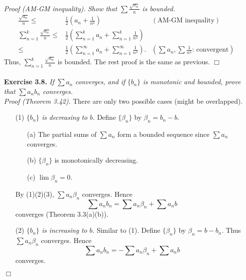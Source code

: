 \documentclass{article}
\begin{document}
\emph{Proof (AM-GM inequality).}
\emph{Show that $\sum\frac{\sqrt{a_n}}{n}$ is bounded.}
\begin{align*}
\frac{\sqrt{a_n}}{n}
\leq&
\frac{1}{2}
\left( a_n + \frac{1}{n^2} \right)
  &(\text{AM-GM inequality}) \\
\sum_{n=1}^{k} \frac{\sqrt{a_n}}{n}
\leq&
\frac{1}{2}
\left( \sum_{n=1}^{k} a_n + \sum_{n=1}^{k} \frac{1}{n^2} \right) \\
\leq&
\frac{1}{2}
\left( \sum_{n=1}^{\infty} a_n + \sum_{n=1}^{\infty} \frac{1}{n^2} \right).
  &\left(\text{$\sum{a_n}, \sum{\frac{1}{n^2}}$: convergent}\right)
\end{align*}
Thus, $\sum_{n=1}^{k}\frac{\sqrt{a_n}}{n}$ is bounded.
The rest proof is the same as previous.
$\Box$ \\\\






\textbf{Exercise 3.8.}
\emph{If $\sum a_n$ converges, and if $\{b_n\}$ is monotonic and bounded,
prove that $\sum a_n b_n$ converges.} \\

\emph{Proof (Theorem 3.42).}
There are only two possible cases (might be overlapped).
\begin{enumerate}
\item[(1)]
\emph{$\{b_n\}$ is decreasing to $b$.}
Define $\{ \beta_n \}$ by $\beta_n = b_n - b$.
  \begin{enumerate}
  \item[(a)]
  The partial sums of $\sum a_n$ form a bounded sequence since
  $\sum a_n$ converges.
  \item[(b)]
  $\{ \beta_n \}$ is monotonically decreasing.
  \item[(c)]
  $\lim \beta_n = 0$.
  \end{enumerate}
  By (1)(2)(3), $\sum a_n \beta_n$ converges.
  Hence $$\sum a_n b_n = \sum a_n \beta_n + \sum a_n b$$ converges
  (Theorem 3.3(a)(b)).
\item[(2)]
\emph{$\{b_n\}$ is increasing to $b$.}
Similar to (1).
Define $\{ \beta_n \}$ by $\beta_n = b - b_n$.
Thus $\sum a_n \beta_n$ converges.
Hence
$$\sum a_n b_n = - \sum a_n \beta_n + \sum a_n b$$ converges.
\end{enumerate}
$\Box$ \\\\
\end{document}
